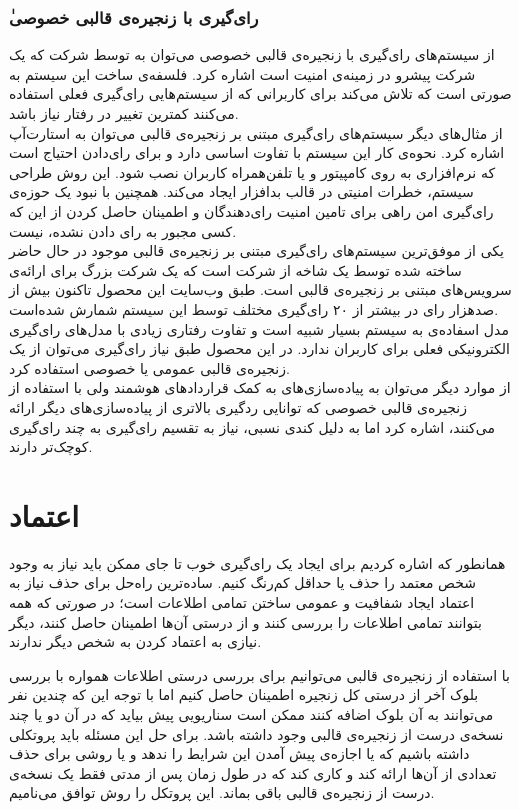 \subsubsection{ٰرای‌گیری با زنجیره‌ی قالبی خصوصی}
از سیستم‌های رای‌گیری با زنجیره‌ی قالبی خصوصی می‌توان به 
\cite{votebook}
توسط شرکت 
که یک شرکت پیشرو در زمینه‌ی امنیت است اشاره کرد. فلسفه‌ی ساخت این سیستم به صورتی است که تلاش می‌کند برای کاربرانی که از سیستم‌هایی رای‌گیری فعلی استفاده می‌کنند کمترین تغییر در رفتار نیاز باشد. 
\\
از مثال‌های دیگر سیستم‌های رای‌گیری مبتنی بر زنجیره‌ی قالبی می‌توان به استارت‌آپ 
اشاره کرد. نحوه‌ی کار این سیستم با  
تفاوت اساسی دارد و برای رای‌دادن احتیاج است که نرم‌‌افزاری به روی کامپیتور و یا تلفن‌همراه کاربران نصب شود. این روش طراحی سیستم،‌ خطرات امنیتی در قالب بدافزار ایجاد می‌کند. همچنین با نبود یک حوزه‌ی رای‌گیری امن راهی برای تامین امنیت رای‌دهندگان و اطمینان حاصل کردن از این که کسی مجبور به رای‌ دادن نشده، نیست.
\\
یکی از موفق‌ترین سیستم‌های رای‌گیری مبتنی بر زنجیره‌ی قالبی موجود در حال حاضر 
ساخته شده توسط یک شاخه از شرکت 
است که یک شرکت بزرگ برای ارائه‌ی سرویس‌های مبتنی بر زنجیره‌ی قالبی است. طبق وب‌سایت این محصول تاکنون بیش از صدهزار رای در بیشتر از ۲۰ رای‌گیری مختلف توسط این سیستم‌ شمارش شده‌است. 
\\
مدل اسفاده‌ی 
به سیستم‌ 
بسیار شبیه است و تفاوت رفتاری زیادی با مدل‌های رای‌گیری الکترونیکی فعلی برای کاربران ندارد. در این محصول طبق نیاز رای‌گیری می‌توان از یک زنجیره‌ی قالبی عمومی یا خصوصی استفاده کرد.
\\
از موارد دیگر می‌توان به پیاده‌سازی‌های به کمک قرارداد‌های هوشمند ولی با استفاده از زنجیره‌ی قالبی خصوصی 
\cite{privblock}
که توانایی ردگیری بالاتری از پیاده‌سازی‌های دیگر ارائه می‌کنند، اشاره کرد اما به دلیل کندی نسبی، نیاز به تقسیم رای‌گیری به چند رای‌گیری کوچک‌تر دارند.


\section{اعتماد}
همانطور که اشاره کردیم برای ایجاد یک رای‌گیری خوب تا جای ممکن باید نیاز به وجود شخص معتمد را حذف یا حداقل کم‌رنگ کنیم. ساده‌ترین راه‌حل برای حذف نیاز به اعتماد ایجاد شفافیت و عمومی ساختن تمامی اطلاعات است؛ در صورتی که همه بتوانند تمامی اطلاعات را بررسی کنند و از درستی آن‌ها اطمینان حاصل کنند، دیگر نیازی به اعتماد کردن به شخص دیگر ندارند. 
\par 
با استفاده از زنجیره‌ی قالبی می‌‌توانیم برای بررسی درستی اطلاعات همواره با بررسی بلوک آخر از درستی کل زنجیره اطمینان حاصل کنیم اما با توجه این که چندین نفر می‌توانند به آن بلوک اضافه کنند ممکن است سناریویی پیش بیاید که در آن دو یا چند نسخه‌ی درست از زنجیره‌ی قالبی وجود داشته باشد. برای حل این مسئله باید پروتکلی داشته باشیم که یا اجازه‌ی پیش آمدن این شرایط را ندهد و یا روشی برای حذف تعدادی از آن‌ها ارائه کند و کاری کند که در طول زمان پس از مدتی فقط یک نسخه‌ی درست از زنجیره‌ی قالبی باقی بماند. این پروتکل را روش توافق می‌نامیم.
